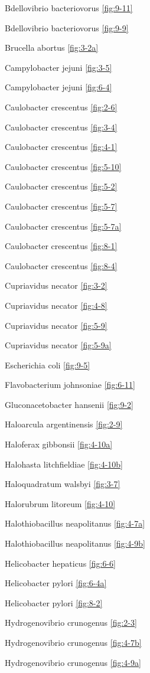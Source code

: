 \documentclass[]{tufte-book}
\begin{document}
Bdellovibrio bacteriovorus \ref{fig:9-11}

Bdellovibrio bacteriovorus \ref{fig:9-9}

Brucella abortus \ref{fig:3-2a}

Campylobacter jejuni \ref{fig:3-5}

Campylobacter jejuni \ref{fig:6-4}

Caulobacter crescentus \ref{fig:2-6}

Caulobacter crescentus \ref{fig:3-4}

Caulobacter crescentus \ref{fig:4-1}

Caulobacter crescentus \ref{fig:5-10}

Caulobacter crescentus \ref{fig:5-2}

Caulobacter crescentus \ref{fig:5-7}

Caulobacter crescentus \ref{fig:5-7a}

Caulobacter crescentus \ref{fig:8-1}

Caulobacter crescentus \ref{fig:8-4}

Cupriavidus necator \ref{fig:3-2}

Cupriavidus necator \ref{fig:4-8}

Cupriavidus necator \ref{fig:5-9}

Cupriavidus necator \ref{fig:5-9a}

Escherichia coli \ref{fig:9-5}

Flavobacterium johnsoniae \ref{fig:6-11}

Gluconacetobacter hansenii \ref{fig:9-2}

Haloarcula argentinensis \ref{fig:2-9}

Haloferax gibbonsii \ref{fig:4-10a}

Halohasta litchfieldiae \ref{fig:4-10b}

Haloquadratum walsbyi \ref{fig:3-7}

Halorubrum litoreum \ref{fig:4-10}

Halothiobacillus neapolitanus \ref{fig:4-7a}

Halothiobacillus neapolitanus \ref{fig:4-9b}

Helicobacter hepaticus \ref{fig:6-6}

Helicobacter pylori \ref{fig:6-4a}

Helicobacter pylori \ref{fig:8-2}

Hydrogenovibrio crunogenus \ref{fig:2-3}

Hydrogenovibrio crunogenus \ref{fig:4-7b}

Hydrogenovibrio crunogenus \ref{fig:4-9a}
\end{document}
